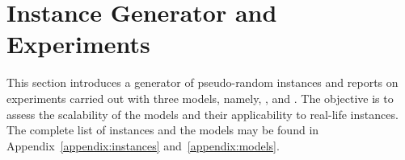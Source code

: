 \section{Instance Generator and Experiments}\label{sec:experiments}

This section introduces a generator of pseudo-random \UTP{} instances
and reports on experiments carried out with three models, namely, \CP{}, \ASP{} and \MIP{}.
The objective is to assess the scalability of the models
and their applicability to real-life instances.
The complete list of instances and the models may be found in Appendix~\ref{appendix:instances} and~\ref{appendix:models}.




